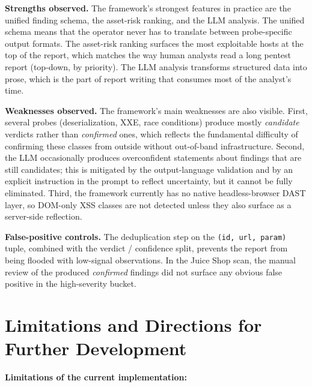 \textbf{Strengths observed.} The framework's strongest features in practice are the unified finding schema, the asset-risk ranking, and the LLM analysis. The unified schema means that the operator never has to translate between probe-specific output formats. The asset-risk ranking surfaces the most exploitable hosts at the top of the report, which matches the way human analysts read a long pentest report (top-down, by priority). The LLM analysis transforms structured data into prose, which is the part of report writing that consumes most of the analyst's time.

\textbf{Weaknesses observed.} The framework's main weaknesses are also visible. First, several probes (deserialization, XXE, race conditions) produce mostly \textit{candidate} verdicts rather than \textit{confirmed} ones, which reflects the fundamental difficulty of confirming these classes from outside without out-of-band infrastructure. Second, the LLM occasionally produces overconfident statements about findings that are still candidates; this is mitigated by the output-language validation and by an explicit instruction in the prompt to reflect uncertainty, but it cannot be fully eliminated. Third, the framework currently has no native headless-browser DAST layer, so DOM-only XSS classes are not detected unless they also surface as a server-side reflection.

\textbf{False-positive controls.} The deduplication step on the \texttt{(id, url, param)} tuple, combined with the verdict / confidence split, prevents the report from being flooded with low-signal observations. In the Juice Shop scan, the manual review of the produced \textit{confirmed} findings did not surface any obvious false positive in the high-severity bucket.

\section{Limitations and Directions for Further Development}

\textbf{Limitations of the current implementation:}

